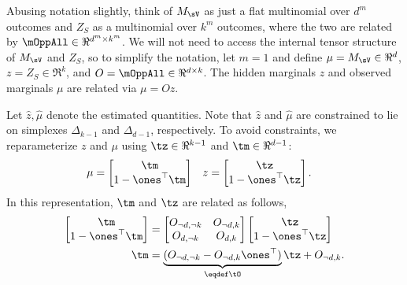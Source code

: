 Abusing notation slightly, think of $M_\sV$ as just a flat multinomial over $d^m$ outcomes
and $Z_S$ as a multinomial over $k^m$ outcomes, where the two are related by
$\mOppAll \in \Re^{d^m \times k^m}$.
We will not need to access the internal tensor structure of $M_\sV$ and $Z_S$,
so to simplify the notation, let $m=1$
and define $\mu = M_\sV \in \Re^d$,
$z = Z_S \in \Re^k$,
and $O = \mOppAll \in \Re^{d \times k}$.
The hidden marginals $z$ and observed marginals $\mu$ are related via $\mu = O z$.

Let $\hat z, \hat\mu$ denote the estimated quantities.
Note that $\hat z$ and $\hat \mu$ are constrained to lie on simplexes $\Delta_{k-1}$ and $\Delta_{d-1}$, respectively. 
To avoid constraints, we reparameterize $z$ and $\mu$ using
$\tz \in \Re^{k-1}$ and $\tm \in \Re^{d-1}$:
\begin{align*}
  \mu &= 
    \begin{bmatrix}
      \tm \\
      1 - \ones^\top\tm
    \end{bmatrix} 
  &
  z &= 
    \begin{bmatrix}
      \tz \\
      1 - \ones^\top\tz
    \end{bmatrix}.
\end{align*}
In this representation, $\tm$ and $\tz$ are related as follows,
\begin{align*}
  \begin{bmatrix}
    \tm \\
    1 - \ones^\top\tm
  \end{bmatrix} 
  &=
    \begin{bmatrix}
      O_{\neg d,\neg k} & O_{\neg d, k} \\ 
      O_{d,\neg k} & O_{d, k} \\ 
    \end{bmatrix}
    \begin{bmatrix}
      \tz \\
      1 - \ones^\top\tz
    \end{bmatrix} \\
  \tm 
      &= \underbrace{(O_{\neg d,\neg k} - O_{\neg d, k} \ones^\top )}_{\eqdef \tO} \tz +  O_{\neg d,k}.
\end{align*}

